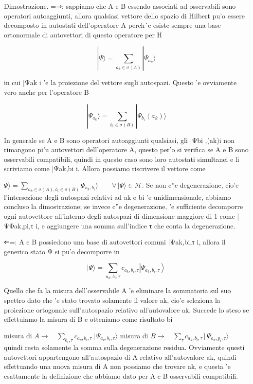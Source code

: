 {	Dimostrazione. =⇒: sappiamo che A e B essendo associati ad osservabili sono operatori autoaggiunti, allora qualsiasi vettore dello spazio di Hilbert pu'o essere decomposto in autostati dell'operatore A perch´e esiste sempre una base ortonormale di autovettori di questo operatore per H
	
	$$|\Psi\rangle=\sum_{a_{k}\in\sigma(A)}|\Psi_{a_{k}}\rangle$$
	
	in cui |Ψak i 'e la proiezione del vettore sugli autospazi. Questo 'e ovviamente vero anche per l'operatore B
	
	$$|\Psi_{a_{k}}\rangle=\sum_{b_{i}\in\sigma(B)}|\Psi_{b_{i}}(a_{k})\rangle$$
	
	In generale se A e B sono operatori autoaggiunti qualsiasi, gli |Ψbi
	,(ak)i non rimangono pi'u autovettori dell'operatore A, questo per'o si verifica se A e B sono osservabili compatibili, quindi in questo caso sono loro autostati simultanei e li scriviamo come |Ψak,bi i. Allora possiamo riscrivere il vettore come
	
	$\Psi\rangle=\sum_{a_{k}\in\sigma(A),b_{i}\in\sigma(B)}\Psi_{a_{k},b_{i}}\rangle\qquad\forall\,|\Psi\rangle\in\mathcal{H}$.  
	Se non c''e degenerazione, cio'e l'intersezione degli autospazi relativi ad ak e bi 'e unidimensionale, abbiamo concluso la dimostrazione; se invece c''e degenerazione, 'e sufficiente decomporre ogni autovettore all'interno degli autospazi di dimensione maggiore di 1 come |ΨΦak,pi,τ i, e aggiungere una somma sull'indice τ che conta la degenerazione.
	
	⇐=: A e B possiedono una base di autovettori comuni |Ψak,bi,τ i, allora il generico stato Ψ si pu'o decomporre in
	
	$$|\Psi\rangle=\sum_{a_{k},b_{i},\tau}c_{a_{k},b_{i},\tau}\left|\Psi_{a_{k},b_{i},\tau}\right\rangle$$
	
	Quello che fa la misura dell'osservabile A 'e eliminare la sommatoria sul suo spettro dato che 'e stato trovato solamente il valore ak, cio'e seleziona la proiezione ortogonale sull'autospazio relativo all'autovalore ak. Succede lo steso se effettuiamo la misura di B e otteniamo come risultato bi
	
	misura di $A\to\quad\sum_{b_{i},\tau}c_{a_{k},b_{i},\tau}\,|\,\Psi_{a_{k},b_{i},\tau}\rangle$ misura di $B\to\quad\sum_{\tau}c_{a_{k},b_{i},\tau}\,|\,\Psi_{a_{k},p_{i},\tau}\rangle$
	quindi resta solamente la somma sulla degenerazione residua. Ovviamente questi autovettori appartengono all'autospazio di A relativo all'autovalore ak, quindi effettuando una nuova misura di A non possiamo che trovare ak, e questa 'e esattamente la definizione che abbiamo dato per A e B osservabili compatibili.
	
}
